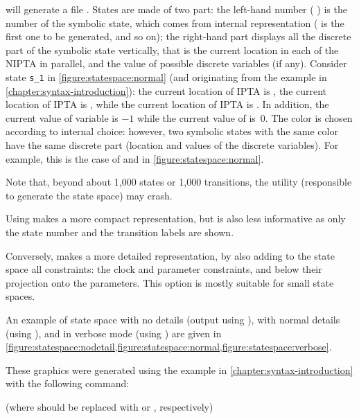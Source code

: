 \imitator{} will generate a file .
States are made of two part: the left-hand number (\eg{} ) is the number of the symbolic state, which comes from \imitator{} internal representation ( is the first one to be generated, and so on); the right-hand part displays all the discrete part of the symbolic state vertically, that is the current location in each of the NIPTA in parallel, and the value of possible discrete variables (if any).
Consider state \texttt{s\_1} in \cref{figure:statespace:normal} (and originating from the example in \cref{chapter:syntax-introduction}):
the current location of IPTA  is ,
the current location of IPTA  is ,
while
the current location of IPTA  is .
In addition, the current value of variable  is $-1$ while the current value of  is~0.
The color is chosen according to \imitator{} internal choice: however, two symbolic states with the same color have the same discrete part (location and values of the discrete variables).
For example, this is the case of  and  in \cref{figure:statespace:normal}.

Note that, beyond about 1,000 states or 1,000 transitions, the \gdot{} utility (responsible to generate the state space) may crash.

Using  makes a more compact representation, but is also less informative as only the state number and the transition labels are shown.

Conversely,  makes a more detailed representation, by also adding to the state space all constraints:
the clock and parameter constraints, and below their projection onto the parameters.
This option is mostly suitable for small state spaces.

\begin{example}
	An example of state space with no details (output using ), with normal details (using ), and in verbose mode (using ) are given in \cref{figure:statespace:nodetail,figure:statespace:normal,figure:statespace:verbose}.

	These graphics were generated using the example in \cref{chapter:syntax-introduction} with the following command:


	(where  should be replaced with  or , respectively)
\end{example}

